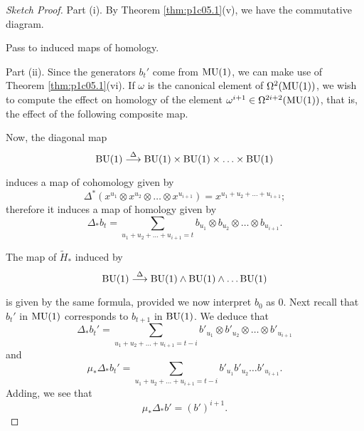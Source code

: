 \documentclass[../main]{subfiles}
\begin{document}
\begin{proof}[Sketch Proof]
Part (i). By Theorem \ref{thm:p1c05.1}(v), we have the commutative diagram. 

\begin{center}
\end{center}

Pass to induced maps of homology.

Part (ii). Since the generators $b_t'$ come from $\mathrm{MU}(1)$, we can make use of Theorem \ref{thm:p1c05.1}(vi). If $\omega$ is the canonical element of $\Omega^2(\mathrm{MU}(1))$, we wish to compute the effect on homology of the element $\omega^{i + 1} \in \Omega^{2i + 2} (\mathrm{MU}(1))$, that is, the effect of the following composite map.

\begin{center}
\end{center} 

Now, the diagonal map \[\te{BU}(1) \lar{\Delta} \te{BU}(1) \times \te{BU}(1) \times \ldots \times \te{BU}(1)\] induces a map of cohomology given by \[\Delta^\ast (x^{u_1} \otimes x^{u_2} \otimes \ldots \otimes x^{u_{i + 1}}) = x^{u_1 + u_2 + \ldots + u_{i + 1}};\] therefore it induces a map of homology given by \[\Delta_\ast b_t = \sum_{u_1 + u_2 + \ldots + u_{i + 1} = t} b_{u_1} \otimes b_{u_2} \otimes \ldots \otimes b_{u_{i + 1}}.\]

The map of ${\tilde H}_\ast$ induced by \[\te{BU}(1) \lar{\Delta} \te{BU}(1) \wedge \te{BU}(1) \wedge \ldots \te{BU}(1)\] is given by the same formula, provided we now interpret $b_0$ as $0$. Next recall that $b_t'$ in $\mathrm{MU}(1)$ corresponds to $b_{t + 1}$ in $\mathrm{BU}(1)$. We deduce that \[\Delta_\ast b_t' = \sum_{u_1 + u_2 + \ldots + u_{i + 1} = t - i} b'_{u_1} \otimes b'_{u_2} \otimes \ldots \otimes b'_{u_{i + 1}}\] and \[\mu_\ast \Delta_\ast b_t' = \sum_{u_1 + u_2 + \ldots + u_{i + 1} = t - i} b'_{u_1} b'_{u_2} \ldots b'_{u_{i + 1}}.\] Adding, we see that \[\mu_\ast \Delta_\ast b' = (b')^{i + 1}.\]


\end{proof}
\end{document}
